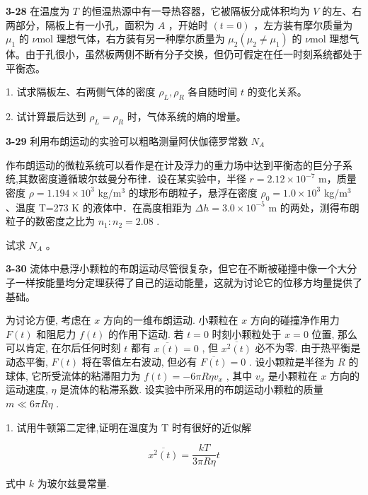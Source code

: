 \textbf{3-28} 在温度为 $T$ 的恒温热源中有一导热容器，它被隔板分成体积均为 $V$ 的左、右两部分，隔板上有一小孔，面积为 $A$ ，开始时 $(t = 0)$ ，左方装有摩尔质量为 $\mu_{1}$ 的 $\nu \mathrm{mol}$ 理想气体，右方装有另一种摩尔质量为 $\mu_{2}(\mu_{2} \neq \mu_{1})$ 的 $\nu \mathrm{mol}$ 理想气体。由于孔很小，虽然板两侧不断有分子交换，但仍可假定在任一时刻系统都处于平衡态。

1. 试求隔板左、右两侧气体的密度 $\rho_{L}, \rho_{R}$ 各自随时间 $t$ 的变化关系。

2. 试计算最后达到 $\rho_{L} = \rho_{R}$ 时，气体系统的熵的增量。
\vfill
\newpage

\textbf{3-29} 利用布朗运动的实验可以粗略测量阿伏伽德罗常数 $N_{A}$

作布朗运动的微粒系统可以看作是在计及浮力的重力场中达到平衡态的巨分子系统,其数密度遵循玻尔兹曼分布律．设在某实验中，半径 $r=2.12\times10^{-7}$ m，质量密度 $\rho=1.194\times10^{3}$ kg/m$^{3}$ 的球形布朗粒子，悬浮在密度 $\rho_{0}=1.0\times10^{3}$ kg/m$^{3}$ 、温度 T=273 K 的液体中．在高度相距为 $\Delta h=3.0\times10^{-5}$ m 的两处，测得布朗粒子的数密度之比为 $n_{1}:n_{2}=2.08$ .

试求 $N_{A}$ 。
\vfill
\newpage

\textbf{3-30} 流体中悬浮小颗粒的布朗运动尽管很复杂，但它在不断被碰撞中像一个大分子一样按能量均分定理获得了自己的运动能量，这就为讨论它的位移方均量提供了基础。

为讨论方便, 考虑在 $x$ 方向的一维布朗运动. 小颗粒在 $x$ 方向的碰撞净作用力 $F(t)$ 和阻尼力 $f(t)$ 的作用下运动. 若 $t = 0$ 时刻小颗粒处于 $x = 0$ 位置, 那么可以肯定, 在尔后任何时刻 $t$ 都有 $\overline{x(t)} = 0$ , 但 $\overline{x^2(t)}$ 必不为零. 由于热平衡是动态平衡, $F(t)$ 将在零值左右波动, 但必有 $\overline{F(t)} = 0$ . 设小颗粒是半径为 $R$ 的球体, 它所受流体的粘滞阻力为 $f(t) = -6\pi R\eta v_x$ , 其中 $v_x$ 是小颗粒在 $x$ 方向的运动速度, $\eta$ 是流体的粘滞系数. 设实验中所采用的布朗运动小颗粒的质量 $m \ll 6\pi R\eta$ .

1. 试用牛顿第二定律,证明在温度为 T 时有很好的近似解

$$
\overline{x^2(t)} = \frac{kT}{3\pi R\eta}t
$$

式中 $k$ 为玻尔兹曼常量.

